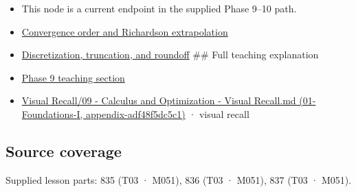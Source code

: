 \begin{itemize}
\item
  This node is a current endpoint in the supplied Phase 9--10 path.
\item
  \hyperref[appendix-aca80b6bf17a]{Convergence order and Richardson extrapolation}
\item
  \hyperref[appendix-6b0648b2b8e8]{Discretization, truncation, and roundoff} \#\# Full teaching explanation
\item
  \href{Continuous\%20Notes/Computing\%20Foundations\%20-\%20From\%20Bits\%20to\%20C++\%20and\%20Systems\%20APIs\#Integration\%20and\%20quadrature}{Phase 9 teaching section}
\item
  \href{}{Visual Recall/09 - Calculus and Optimization - Visual Recall.md (01-Foundations-I, appendix-adf48f5dc5c1)} · visual recall
\end{itemize}

\subsection{Source coverage}\label{source-coverage}

Supplied lesson parts: 835 (T03 · M051), 836 (T03 · M051), 837 (T03 · M051).
